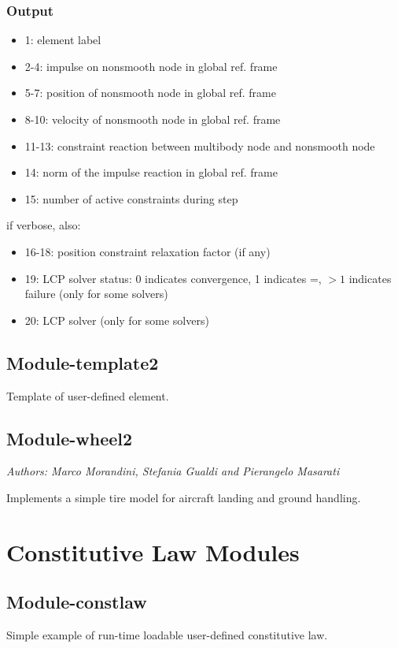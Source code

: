 \subsubsection{Output}
\begin{itemize}
\item 1: element label
\item 2-4:   impulse on nonsmooth node in global ref. frame
\item 5-7:   position of nonsmooth node in global ref. frame
\item 8-10:  velocity of nonsmooth node in global ref. frame
\item 11-13: constraint reaction between multibody node and nonsmooth node
\item 14:    norm of the impulse reaction in global ref. frame
\item 15:    number of active constraints during step
\end{itemize}
if verbose, also:
\begin{itemize}
\item 16-18: position constraint relaxation factor (if any)
\item 19:    LCP solver status: 0 indicates convergence, 1 indicates =, $>1$ indicates failure
(only for some solvers)
\item 20:    LCP solver 
(only for some solvers)
\end{itemize}


\subsection{Module-template2}
Template of user-defined element.

\subsection{Module-wheel2}
\emph{Authors: Marco Morandini, Stefania Gualdi and Pierangelo Masarati}

\noindent
Implements a simple tire model for aircraft landing and ground handling.



\section{Constitutive Law Modules}

\subsection{Module-constlaw}
Simple example of run-time loadable user-defined constitutive law.

